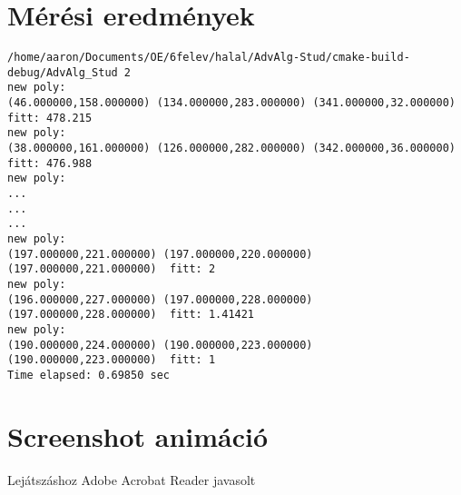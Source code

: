 \documentclass[12pt,a4paper,oneside]{report}
\begin{document}
\section*{Mérési eredmények}
\begin{lstlisting}
/home/aaron/Documents/OE/6felev/halal/AdvAlg-Stud/cmake-build-debug/AdvAlg_Stud 2
new poly: 
(46.000000,158.000000) (134.000000,283.000000) (341.000000,32.000000)  fitt: 478.215
new poly: 
(38.000000,161.000000) (126.000000,282.000000) (342.000000,36.000000)  fitt: 476.988
new poly: 
...
...
...
new poly: 
(197.000000,221.000000) (197.000000,220.000000) (197.000000,221.000000)  fitt: 2
new poly: 
(196.000000,227.000000) (197.000000,228.000000) (197.000000,228.000000)  fitt: 1.41421
new poly: 
(190.000000,224.000000) (190.000000,223.000000) (190.000000,223.000000)  fitt: 1
Time elapsed: 0.69850 sec
\end{lstlisting}

\section*{Screenshot animáció}
Lejátszáshoz Adobe Acrobat Reader javasolt\newline
{}
\end{document}
